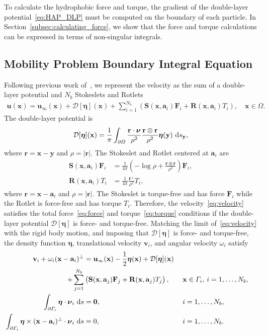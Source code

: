 \documentclass[lineno]{jfm}
\renewcommand{\aa}{\mathbf{a}}
\newcommand{\bd}{\partial}
\newcommand{\DD}{\mathcal{D}}
\newcommand{\eeta}{\boldsymbol{\eta}}
\newcommand{\FF}{\mathbf{F}}
\newcommand{\nnu}{\boldsymbol{\nu}}
\newcommand{\rr}{\mathbf{r}}
\newcommand{\RR}{\mathbf{R}}
\renewcommand{\SS}{\mathbf{S}}
\newcommand{\xx}{\mathbf{x}}
\newcommand{\uu}{\mathbf{u}}
\renewcommand{\vv}{\mathbf{v}}
\newcommand{\yy}{\mathbf{y}}
\begin{document}
To calculate the hydrophobic force and torque, the gradient of the
double-layer potential~\eqref{eq:HAP_DLP} must be computed on the
boundary of each particle. In Section~\ref{subsec:calculating_force}, we
show that the force and torque calculations can be expressed in terms of
non-singular integrals.

\subsection{Mobility Problem Boundary Integral Equation}
Following previous work of~\cite{Lukas19}, we represent the velocity as
the sum of a double-layer potential and $N_b$ Stokeslets and Rotlets
\begin{align}
  \label{eq:velocity}
  \uu(\xx) = \uu_\infty(\xx) + \DD[\eeta](\xx) + 
    \sum_{i=1}^{N_b} \left(\SS(\xx,\aa_i) \FF_i + 
    \RR(\xx,\aa_i) T_i\right), \quad \xx \in \Omega.
\end{align}
The double-layer potential is
\begin{align}
  \DD[\eeta](\xx) = \frac{1}{\pi} \int_{\bd\Omega} 
    \frac{\rr \cdot \nnu}{\rho^2} \frac{\rr \otimes \rr}{\rho^2}
    \eeta(\yy) \, \dif s_\yy,
\end{align}
where $\rr = \xx - \yy$ and $\rho = |\rr|$. The Stokeslet and Rotlet
centered at $\aa_i$ are
\begin{align}
  \SS(\xx,\aa_i)\FF_i &= \frac{1}{4\pi} \left(-\log \rho + 
    \frac{\rr \otimes \rr}{\rho^2}\right) \FF_i, \\
  \RR(\xx,\aa_i)T_i &= \frac{1}{4\pi} \frac{\rr^\perp}{\rho^2} T_i,
\end{align}
where $\rr = \xx - \aa_i$ and $\rho = |\rr|$. The Stokeslet is
torque-free and has force $\FF_i$ while the Rotlet is force-free and has
torque $T_i$. Therefore, the velocity~\eqref{eq:velocity} satisfies the
total force~\eqref{eq:force} and torque~\eqref{eq:torque} conditions
if the double-layer potential $\DD[\eeta]$ is force- and torque-free.
Matching the limit of~\eqref{eq:velocity} with the rigid body motion,
and imposing that $\DD[\eeta]$ is force- and torque-free, the density
function $\eeta$, translational velocity $\vv_i$, and angular velocity
$\omega_i$ satisfy
\begin{alignat}{3}
  \nonumber
  \vv_i + \omega_i (\xx - \aa_i)^\perp &= \uu_\infty(\xx)
    -\frac{1}{2} \eeta(\xx) + \DD[\eeta](\xx) \\
  \label{eq:SKIE}
    + \sum_{j=1}^{N_b} &
    \left(\SS(\xx,\aa_j) \FF_j + \RR(\xx,\aa_j) T_j\right),
    \quad &&\xx \in \Gamma_i,\: i=1,\ldots,N_b, \\
  \label{eq:mobility1}
  \int_{\bd\Gamma_i} \eeta \cdot \nnu_i \, \dif s &= {\bf 0}, 
  &&i = 1,\ldots,N_b, \\
  \label{eq:mobility2}
  \int_{\bd\Gamma_i} \eeta\times(\xx-\aa_i)^\perp \cdot \nnu_i \, \dif s &= 0,
  &&i = 1,\ldots,N_b.
\end{alignat}
\end{document}
